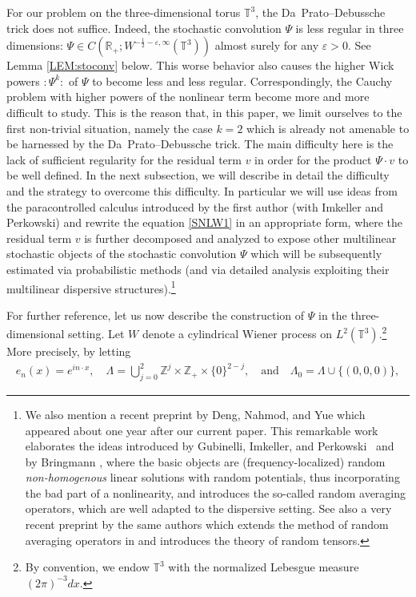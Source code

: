 \documentclass[%
11pt,  reqno]{amsart}
\newcommand{\1}{\hspace{0.2mm}\text{I}\hspace{0.2mm}}
\newcommand{\Z}{\mathbb{Z}}
\newcommand{\R}{\mathbb{R}}
\newcommand{\T}{\mathbb{T}}
\newcommand{\eps}{\varepsilon}
\newcommand{\Ld}{\Lambda}
\numberwithin{equation}{section}
\numberwithin{theorem}{section}
\begin{document}
For our problem on the three-dimensional torus $\T^3$, 
 the Da~Prato--Debussche trick does not suffice.
Indeed,  the stochastic convolution $\Psi$ 
is less regular in three dimensions: $\Psi \in C(\R_+; W^{-\frac{1}{2}-\eps, \infty}(\T^3))$ 
almost surely for any $\eps > 0$.
See Lemma \ref{LEM:stoconv} below. 
This worse behavior also causes  the higher Wick powers $:\!\Psi^k\!:$ of $\Psi$ 
to become less and less regular. 
Correspondingly, the Cauchy problem with higher powers of the nonlinear term become more and more difficult to study. 
This is the reason that, in this paper, we limit ourselves to the first non-trivial situation,
namely the case $k=2$ which is already not amenable to be harnessed by the Da~Prato--Debussche trick. 
The main difficulty here is the lack of sufficient regularity for 
the residual term $v$ in order for the product $\Psi \cdot v$ to be well defined. 
In the next subsection, we will describe in detail the difficulty and the strategy  to overcome this difficulty.
In particular we will use ideas from the paracontrolled calculus introduced
by the first author (with Imkeller and Perkowski) \cite{GIP, CC}
and rewrite the equation \eqref{SNLW1} in an appropriate form,
 where the residual term $v$ is further decomposed and analyzed to expose 
 other multilinear stochastic objects of the stochastic convolution $\Psi$ which will be subsequently estimated via probabilistic methods (and via detailed analysis exploiting  their multilinear dispersive structures).\footnote{We also mention a recent preprint \cite{DNY1} by Deng, Nahmod, and Yue
 which appeared about one year after our current paper.  This remarkable work \cite{DNY1}
 elaborates the ideas 
 introduced by Gubinelli, Imkeller, and Perkowski~\cite{GIP} and
by 
  Bringmann \cite{Bringmann}, 
 where the basic objects are (frequency-localized) random {\it non-homogenous} linear solutions
 with random potentials, 
 thus incorporating the bad part of a nonlinearity, 
  and introduces the so-called random averaging operators, 
 which are well adapted to the dispersive setting.
See also a very recent preprint \cite{DNY2} by the same authors
which extends the method of random averaging operators in \cite{DNY1} 
and introduces the theory of random tensors.}

 


For further reference,
 let us now describe  the construction of $\Psi$ in the three-dimensional setting. 
 Let  $W$ denote a cylindrical Wiener process on $L^2(\T^3)$.\footnote{By convention, 
 we endow $\T^3$ with the normalized Lebesgue measure $(2\pi)^{-3} dx$.}
More precisely, by letting %
\begin{align}
e_n(x) = e^{ i n \cdot x}, \quad 
\Ld = \bigcup_{j=0}^{2} \Z^j\times \Z_{+}\times \{0\}^{2-j}, 
\quad \text{and}\quad \Ld_0 = \Ld \cup\{(0, 0, 0)\},
\label{index}
\end{align}
\end{document}
